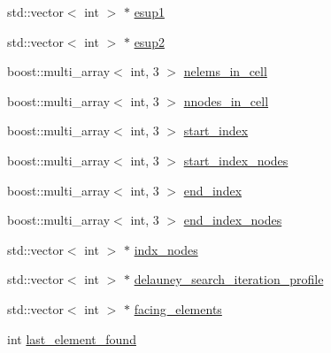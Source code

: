 \begin{DoxyCompactItemize}
\item 
std\-::vector$<$ int $>$ $\ast$ \hyperlink{structccmc_1_1_smart_grid_search_values_a1ae1079a0f6a9f32cc5aa103a3fa382c}{esup1}
\item 
std\-::vector$<$ int $>$ $\ast$ \hyperlink{structccmc_1_1_smart_grid_search_values_a11c1b92acc80aa6a1578da571c665128}{esup2}
\item 
boost\-::multi\-\_\-array$<$ int, 3 $>$ \hyperlink{structccmc_1_1_smart_grid_search_values_aadc85e4c322b99cb7ab8fd6221c39c90}{nelems\-\_\-in\-\_\-cell}
\item 
boost\-::multi\-\_\-array$<$ int, 3 $>$ \hyperlink{structccmc_1_1_smart_grid_search_values_a195799a34293cadcd4438f3c5c44bc6d}{nnodes\-\_\-in\-\_\-cell}
\item 
boost\-::multi\-\_\-array$<$ int, 3 $>$ \hyperlink{structccmc_1_1_smart_grid_search_values_a2e91670c81b6e0f84b5956a9791f18bc}{start\-\_\-index}
\item 
boost\-::multi\-\_\-array$<$ int, 3 $>$ \hyperlink{structccmc_1_1_smart_grid_search_values_aea656ab04297bee4b683516485b8651b}{start\-\_\-index\-\_\-nodes}
\item 
boost\-::multi\-\_\-array$<$ int, 3 $>$ \hyperlink{structccmc_1_1_smart_grid_search_values_a1933de428d8f818afef431140468ff4e}{end\-\_\-index}
\item 
boost\-::multi\-\_\-array$<$ int, 3 $>$ \hyperlink{structccmc_1_1_smart_grid_search_values_ab73630e53f055ab8d329a53698df7398}{end\-\_\-index\-\_\-nodes}
\item 
std\-::vector$<$ int $>$ $\ast$ \hyperlink{structccmc_1_1_smart_grid_search_values_ad4ce80c4991297803d18490d55532560}{indx\-\_\-nodes}
\item 
std\-::vector$<$ int $>$ $\ast$ \hyperlink{structccmc_1_1_smart_grid_search_values_a092fbfb584bde5bfd2889b249c0cf683}{delauney\-\_\-search\-\_\-iteration\-\_\-profile}
\item 
std\-::vector$<$ int $>$ $\ast$ \hyperlink{structccmc_1_1_smart_grid_search_values_a0d7f14a3b9ecf84d325d0b330d1c70de}{facing\-\_\-elements}
\item 
int \hyperlink{structccmc_1_1_smart_grid_search_values_ae238436eb0dc9405525122ce3b3d8faf}{last\-\_\-element\-\_\-found}
\end{DoxyCompactItemize}



